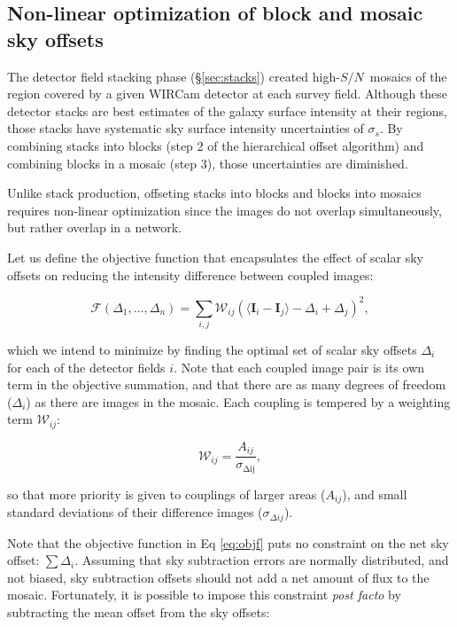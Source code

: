\documentclass[iop]{emulateapj}
\newcommand{\vect}[1]{\boldsymbol{#1}} %
\newcommand{\sn}{\ensuremath{S/N}} %
\begin{document}
\subsection{Non-linear optimization of block and mosaic sky offsets}

The detector field stacking phase (\S \ref{sec:stacks}) created high-\sn\ mosaics of the region covered by a given WIRCam detector at each survey field. Although these detector stacks are best estimates of the galaxy surface intensity at their regions, those stacks have systematic sky surface intensity uncertainties of $\sigma_s$. By combining stacks into blocks (step 2 of the hierarchical offset algorithm) and combining blocks in a mosaic (step 3), those uncertainties are diminished.

Unlike stack production, offseting stacks into blocks and blocks into mosaics requires non-linear optimization since the images do not overlap simultaneously, but rather overlap in a network.

Let us define the objective function that encapsulates the effect of scalar sky offsets on reducing the intensity difference between coupled images:

\begin{equation}
    \mathcal{F} \left(\Delta_1,\ldots,\Delta_n \right) = \sum_{i,j} \mathcal{W}_{ij} \left( \langle \vect{I}_i - \vect{I}_j \rangle - \Delta_i + \Delta_j \right)^2,
    \label{eq:objf}
\end{equation}

\noindent which we intend to minimize by finding the optimal set of scalar sky offsets $\Delta_i$ for each of the detector fields $i$. Note that each coupled image pair is its own term in the objective summation, and that there are as many degrees of freedom ($\Delta_i$) as there are images in the mosaic. Each coupling is tempered by a weighting term $\mathcal{W}_{ij}$:

\begin{equation}
    \mathcal{W}_{ij} = \frac{A_{ij}}{\sigma_{\mathrm{\Delta ij}}},
\end{equation}

\noindent so that more priority is given to couplings of larger areas ($A_{ij}$), and small standard deviations of their difference images ($\sigma_{\Delta ij}$).

Note that the objective function in Eq \ref{eq:objf} puts no constraint on the net sky offset: $\sum \Delta_i$. Assuming that sky subtraction errors are normally distributed, and not biased, sky subtraction offsets should not add a net amount of flux to the mosaic. Fortunately, it is possible to impose this constraint \textit{post facto} by subtracting the mean offset from the sky offsets:
\end{document}
